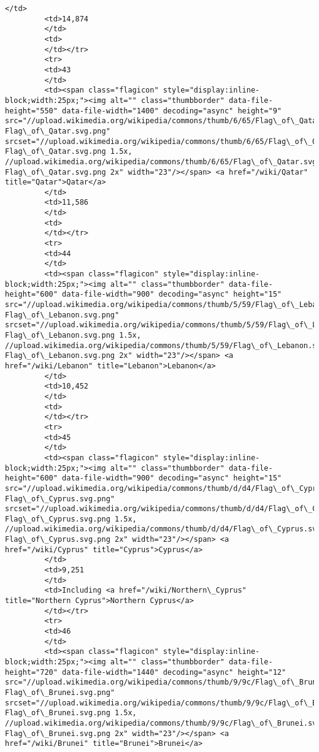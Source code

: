 \documentclass[11pt]{article}
\begin{document}
\begin{Verbatim}[commandchars=\\\{\}]
         </td>
         <td>14,874
         </td>
         <td>
         </td></tr>
         <tr>
         <td>43
         </td>
         <td><span class="flagicon" style="display:inline-block;width:25px;"><img alt="" class="thumbborder" data-file-height="550" data-file-width="1400" decoding="async" height="9" src="//upload.wikimedia.org/wikipedia/commons/thumb/6/65/Flag\_of\_Qatar.svg/23px-Flag\_of\_Qatar.svg.png" srcset="//upload.wikimedia.org/wikipedia/commons/thumb/6/65/Flag\_of\_Qatar.svg/35px-Flag\_of\_Qatar.svg.png 1.5x, //upload.wikimedia.org/wikipedia/commons/thumb/6/65/Flag\_of\_Qatar.svg/46px-Flag\_of\_Qatar.svg.png 2x" width="23"/></span> <a href="/wiki/Qatar" title="Qatar">Qatar</a>
         </td>
         <td>11,586
         </td>
         <td>
         </td></tr>
         <tr>
         <td>44
         </td>
         <td><span class="flagicon" style="display:inline-block;width:25px;"><img alt="" class="thumbborder" data-file-height="600" data-file-width="900" decoding="async" height="15" src="//upload.wikimedia.org/wikipedia/commons/thumb/5/59/Flag\_of\_Lebanon.svg/23px-Flag\_of\_Lebanon.svg.png" srcset="//upload.wikimedia.org/wikipedia/commons/thumb/5/59/Flag\_of\_Lebanon.svg/35px-Flag\_of\_Lebanon.svg.png 1.5x, //upload.wikimedia.org/wikipedia/commons/thumb/5/59/Flag\_of\_Lebanon.svg/45px-Flag\_of\_Lebanon.svg.png 2x" width="23"/></span> <a href="/wiki/Lebanon" title="Lebanon">Lebanon</a>
         </td>
         <td>10,452
         </td>
         <td>
         </td></tr>
         <tr>
         <td>45
         </td>
         <td><span class="flagicon" style="display:inline-block;width:25px;"><img alt="" class="thumbborder" data-file-height="600" data-file-width="900" decoding="async" height="15" src="//upload.wikimedia.org/wikipedia/commons/thumb/d/d4/Flag\_of\_Cyprus.svg/23px-Flag\_of\_Cyprus.svg.png" srcset="//upload.wikimedia.org/wikipedia/commons/thumb/d/d4/Flag\_of\_Cyprus.svg/35px-Flag\_of\_Cyprus.svg.png 1.5x, //upload.wikimedia.org/wikipedia/commons/thumb/d/d4/Flag\_of\_Cyprus.svg/45px-Flag\_of\_Cyprus.svg.png 2x" width="23"/></span> <a href="/wiki/Cyprus" title="Cyprus">Cyprus</a>
         </td>
         <td>9,251
         </td>
         <td>Including <a href="/wiki/Northern\_Cyprus" title="Northern Cyprus">Northern Cyprus</a>
         </td></tr>
         <tr>
         <td>46
         </td>
         <td><span class="flagicon" style="display:inline-block;width:25px;"><img alt="" class="thumbborder" data-file-height="720" data-file-width="1440" decoding="async" height="12" src="//upload.wikimedia.org/wikipedia/commons/thumb/9/9c/Flag\_of\_Brunei.svg/23px-Flag\_of\_Brunei.svg.png" srcset="//upload.wikimedia.org/wikipedia/commons/thumb/9/9c/Flag\_of\_Brunei.svg/35px-Flag\_of\_Brunei.svg.png 1.5x, //upload.wikimedia.org/wikipedia/commons/thumb/9/9c/Flag\_of\_Brunei.svg/46px-Flag\_of\_Brunei.svg.png 2x" width="23"/></span> <a href="/wiki/Brunei" title="Brunei">Brunei</a>

\end{Verbatim}
\end{document}
